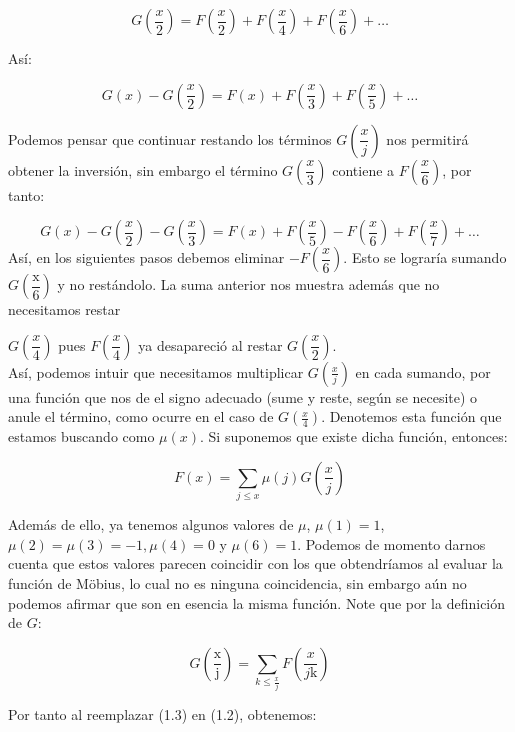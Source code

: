 $$G \left( \frac{x}{2} \right)=F \left( \dfrac{x}{2} \right)+F \left( \frac{x}{4} \right)+F \left( \frac{x}{6} \right)+\ldots$$

Así:

$$G(x)-G \left( \frac{x}{2} \right)=F(x)+F \left( \dfrac{x}{3} \right)+F \left( \dfrac{x}{5} \right)+\ldots$$

Podemos pensar que continuar restando los términos $G \left( \dfrac{x}{j} \right)$ nos permitirá obtener la inversión, sin embargo el término $G \left( \dfrac{x}{3} \right)$ contiene a $F \left( \dfrac{x}{6} \right)$, por tanto:

$$
G(x)-G\left(\frac{x}{2}\right)-G\left(\frac{x}{3}\right)=F(x)+F\left(\frac{x}{5}\right)-F\left(\frac{x}{6}\right)+F\left(\frac{x}{7}\right)+\ldots
$$
Así, en los siguientes pasos debemos eliminar $-F\left(\dfrac{x}{6}\right)$. Esto se lograría sumando $G\left(\dfrac{\mathrm{x}}{6}\right)$ y no restándolo. La suma anterior nos muestra además que no necesitamos restar 

$G\left(\dfrac{x}{4}\right)$ pues $F\left(\dfrac{x}{4}\right)$ ya desapareció al restar $G\left(\dfrac{x}{2}\right)$.\\


Así, podemos intuir que necesitamos multiplicar $G(\frac{x}{j})$ en cada sumando, por una función que nos de el signo adecuado (sume y reste, según se necesite) o anule el término, como ocurre en el caso de $G\left(\frac{x}{4}\right)$. Denotemos esta función que estamos buscando como $\mu(x)$. Si suponemos que existe dicha función, entonces:

\begin{equation}
F(x)=\sum_{j \leqslant x} \mu(j) G\left(\frac{x}{j}\right)
\end{equation}

Además de ello, ya tenemos algunos valores de $\mu$, $\mu(1)=1$, $\mu(2)=\mu(3)=-1, \mu(4)=0$ y $\mu(6)=1$. Podemos de momento darnos cuenta que estos valores parecen coincidir con los que obtendríamos al evaluar la función de Möbius, lo cual no es ninguna coincidencia, sin embargo aún no podemos afirmar que son en esencia la misma función. Note que por la definición de $G$:

\begin{equation}
G\left(\frac{\mathrm{x}}{\mathrm{j}}\right)=\sum_{k\leq \frac{x}{j}} F\left(\frac{x}{j \mathrm{k}}\right)
\end{equation}

Por tanto al reemplazar (1.3) en (1.2), obtenemos:


